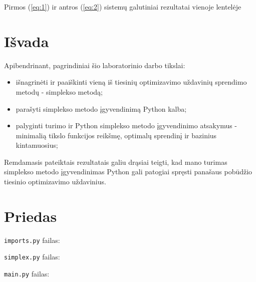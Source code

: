 \documentclass{article}
\begin{document}
\begin{table}[H]
    \centering
    \caption{Pirmos (\ref{eq:1}) ir antros (\ref{eq:2}) sistemų galutiniai rezultatai vienoje lentelėje}
    \label{table:12}
\end{table}
\section{Išvada}
Apibendrinant, pagrindiniai šio laboratorinio darbo tikslai:

\begin{itemize}
    \item išnagrinėti ir paaiškinti vieną iš tiesinių optimizavimo uždavinių sprendimo metodų - simplekso metodą; 
    \item parašyti simplekso metodo įgyvendinimą Python kalba;
    \item palyginti turimo ir Python simplekso metodo įgyvendinimo atsakymus - minimalią tikslo funkcijos reikšmę, optimalų sprendinį ir bazinius kintamuosius;
\end{itemize}
Remdamasis pateiktais rezultatais galiu drąsiai teigti, kad mano turimas simplekso metodo įgyvendinimas Python gali patogiai spręsti panašaus pobūdžio tiesinio optimizavimo uždavinius.
\section{Priedas}
\lstinline|imports.py| failas:

\lstinline|simplex.py| failas:

\lstinline|main.py| failas:
\end{document}
